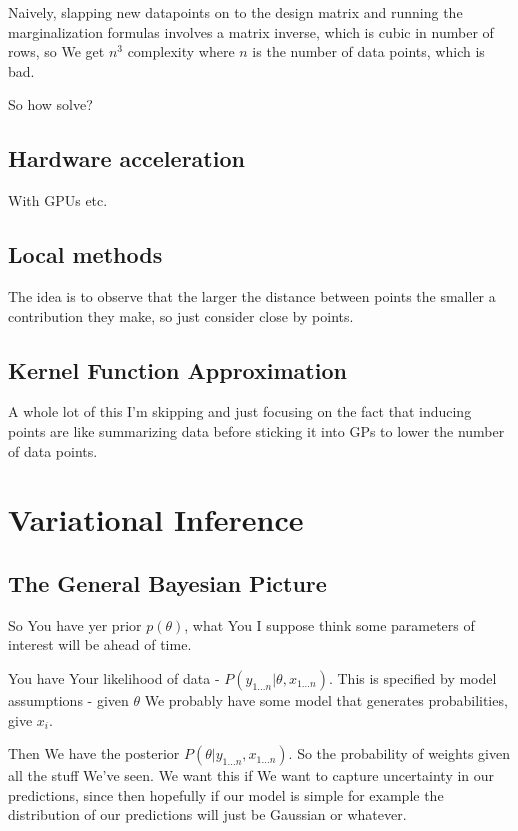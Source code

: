 \documentclass{article}
\begin{document}
		Naively, slapping new datapoints on to the design matrix and running the marginalization formulas involves a matrix inverse, which is cubic in number of rows, so We get $n^3$ complexity where $n$ is the number of data points, which is bad.
		
		So how solve?
		
	\subsection{Hardware acceleration}
	
		With GPUs etc. 
		
	\subsection{Local methods}
	
		The idea is to observe that the larger the distance between points the smaller a contribution they make, so just consider close by points.
		
	\subsection{Kernel Function Approximation}
	
		A whole lot of this I'm skipping and just focusing on the fact that inducing points are like summarizing data before sticking it into GPs to lower the number of data points.
		
		
\section{Variational Inference}

	\subsection{The General Bayesian Picture}
	
		So You have yer prior $p(\theta)$, what You I suppose think some parameters of interest will be ahead of time.
		
		You have Your likelihood of data - $P(y_{1\ldots n} | \theta, x_{1\ldots n})$. This is specified by model assumptions - given $\theta$ We probably have some model that generates probabilities, give $x_i$.
		
		Then We have the posterior $P(\theta|y_{1\ldots n}, x_{1\ldots n})$. So the probability of weights given all the stuff We've seen. We want this if We want to capture uncertainty in our predictions, since then hopefully if our model is simple for example the distribution of our predictions will just be Gaussian or whatever.
		
\end{document}
